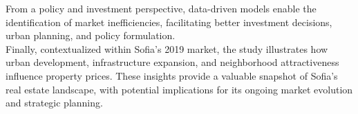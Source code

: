 \documentclass[]{article}
\begin{document}
From a policy and investment perspective, data-driven models enable the identification of market inefficiencies, facilitating better investment decisions, urban planning, and policy formulation.\\


Finally, contextualized within Sofia’s 2019 market, the study illustrates how urban development, infrastructure expansion, and neighborhood attractiveness influence property prices. These insights provide a valuable snapshot of Sofia’s real estate landscape, with potential implications for its ongoing market evolution and strategic planning.\\
\end{document}
